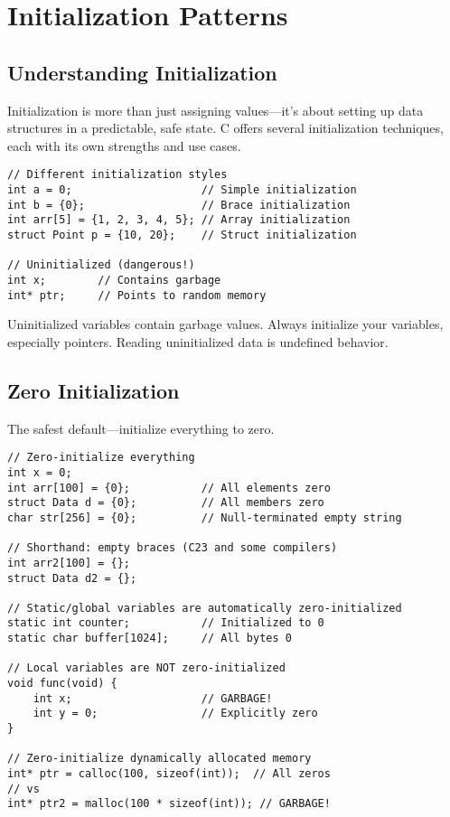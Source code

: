 \chapter{Initialization Patterns}

\section{Understanding Initialization}

Initialization is more than just assigning values—it's about setting up data structures in a predictable, safe state. C offers several initialization techniques, each with its own strengths and use cases.

\begin{lstlisting}
// Different initialization styles
int a = 0;                    // Simple initialization
int b = {0};                  // Brace initialization
int arr[5] = {1, 2, 3, 4, 5}; // Array initialization
struct Point p = {10, 20};    // Struct initialization

// Uninitialized (dangerous!)
int x;        // Contains garbage
int* ptr;     // Points to random memory
\end{lstlisting}

\begin{warningbox}
Uninitialized variables contain garbage values. Always initialize your variables, especially pointers. Reading uninitialized data is undefined behavior.
\end{warningbox}

\section{Zero Initialization}

The safest default—initialize everything to zero.

\begin{lstlisting}
// Zero-initialize everything
int x = 0;
int arr[100] = {0};           // All elements zero
struct Data d = {0};          // All members zero
char str[256] = {0};          // Null-terminated empty string

// Shorthand: empty braces (C23 and some compilers)
int arr2[100] = {};
struct Data d2 = {};

// Static/global variables are automatically zero-initialized
static int counter;           // Initialized to 0
static char buffer[1024];     // All bytes 0

// Local variables are NOT zero-initialized
void func(void) {
    int x;                    // GARBAGE!
    int y = 0;                // Explicitly zero
}

// Zero-initialize dynamically allocated memory
int* ptr = calloc(100, sizeof(int));  // All zeros
// vs
int* ptr2 = malloc(100 * sizeof(int)); // GARBAGE!
\end{lstlisting}

